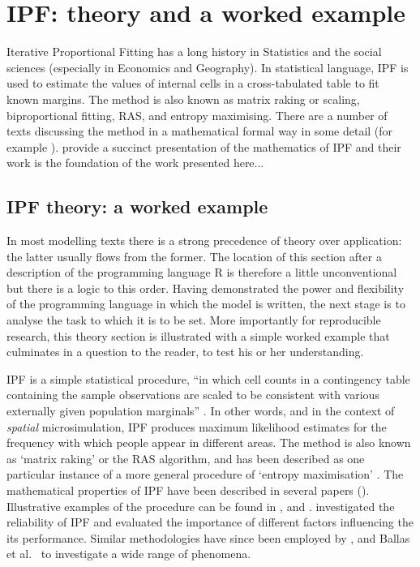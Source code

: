 \documentclass[a4paper,10pt]{article}
\begin{document}
\section{IPF: theory and a worked example}
Iterative Proportional Fitting has a long history in Statistics and the social
sciences (especially in Economics and Geography).
In statistical language, IPF is used to estimate the values of internal
cells in a cross-tabulated table to fit known margins.
The method is also known as matrix raking or scaling,
biproportional fitting, RAS, and entropy maximising.
There are a number of texts discussing the method in a mathematical formal
way in some detail (for example \citealp{Mosteller1968, Fienberg1970, Pritchard2012}).
\citep{Birkin1988} provide a succinct presentation of the
mathematics of IPF and their work is the foundation of
the work presented here...%

\subsection{IPF theory: a worked example} \label{s:theory}
In most modelling texts there is a strong precedence of theory over
application: the latter usually flows from the former. The location 
of this section after a description of the programming language
R is therefore a little unconventional but there is a logic to this order. 
Having demonstrated the power and flexibility of the programming language in
which the model is written, the next stage is to analyse the task to which it
is to be set. More importantly for reproducible research, this theory section
is illustrated with a simple worked example that culminates in
a question to the reader, to test his or her understanding.

IPF is a simple statistical procedure, ``in which cell counts in a contingency
table containing the sample observations are scaled to be consistent with
various externally given population marginals'' \citep{mcfadden2006testing}. In
other words, and in the context of \emph{spatial} microsimulation, IPF produces
maximum likelihood estimates for the frequency with which people appear in
different areas. The method is also known as `matrix raking' or the RAS
algorithm, 
 and has been described as one
particular instance of a more general procedure of `entropy maximisation'
\citep{Johnston1993, blien1998entropy}.
The mathematical properties of IPF
have been described in several papers
(\citealp{Bishop1975, Fienberg1970, Birkin1988}).
Illustrative examples of the procedure can be found in
\citet{Saito1992}, \citet{Wong1992}
and \citet{Norman1999a}. \citet{Wong1992} investigated the reliability of IPF
and evaluated the importance of different factors influencing the its
performance. Similar methodologies have since been employed by
\citet{Mitchell2000}, \citet{Williamson2002} and
Ballas et al.~\citeyearpar{Ballas2005c}
to investigate a wide range of phenomena.
\end{document}
